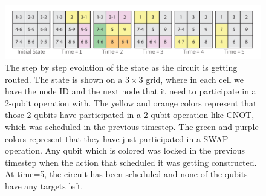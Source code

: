 \begin{figure}[ht]
    \centering
    \includegraphics[width=\linewidth]{figures/qroute/Evolution.pdf}
    \caption{\label{fig:supp-evolution}The step by step evolution of the state as the circuit is getting routed. The state is shown on a $3 \times 3$ grid, where in each cell we have the node ID and the next node that it need to participate in a 2-qubit operation with. The yellow and orange colors represent that those 2 qubits have participated in a 2 qubit operation like CNOT, which was scheduled in the previous timestep. The green and purple colors represent that they have just participated in a SWAP operation. Any qubit which is colored was locked in the previous timestep when the action that scheduled it was getting constructed. At time=5, the circuit has been scheduled and none of the qubits have any targets left.}
\end{figure}

